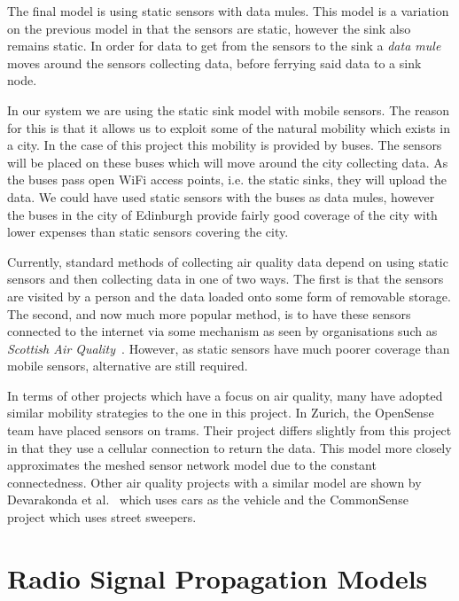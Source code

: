     The final model is using static sensors with data mules. This model is a variation on the previous model in that the sensors are static, however the sink also remains static. In order for data to get from the sensors to the sink a \emph{data mule} moves around the sensors collecting data, before ferrying said data to a sink node. 

    In our system we are using the static sink model with mobile sensors. The reason for this is that it allows us to exploit some of the natural mobility which exists in a city. In the case of this project this mobility is provided by buses. The sensors will be placed on these buses which will move around the city collecting data. As the buses pass open WiFi access points, i.e. the static sinks, they will upload the data. We could have used static sensors with the buses as data mules, however the buses in the city of Edinburgh provide fairly good coverage of the city with lower expenses than static sensors covering the city. 

    Currently, standard methods of collecting air quality data depend on using static sensors and then collecting data in one of two ways. The first is that the sensors are visited by a person and the data loaded onto some form of removable storage. The second, and now much more popular method, is to have these sensors connected to the internet via some mechanism as seen by organisations such as \emph{Scottish Air Quality}~\cite{scottishairquality}. However, as static sensors have much poorer coverage than mobile sensors, alternative are still required. 

    In terms of other projects which have a focus on air quality, many have adopted similar mobility strategies to the one in this project. In Zurich, the OpenSense\cite{opensensezurich} team have placed sensors on trams. Their project differs slightly from this project in that they use a cellular connection to return the data. This model more closely approximates the meshed sensor network model due to the constant connectedness. Other air quality projects with a similar model are shown by Devarakonda et al.~\cite{rtairquality} which uses cars as the vehicle and the CommonSense~\cite{commonsense} project which uses street sweepers. 





\section{Radio Signal Propagation Models}



